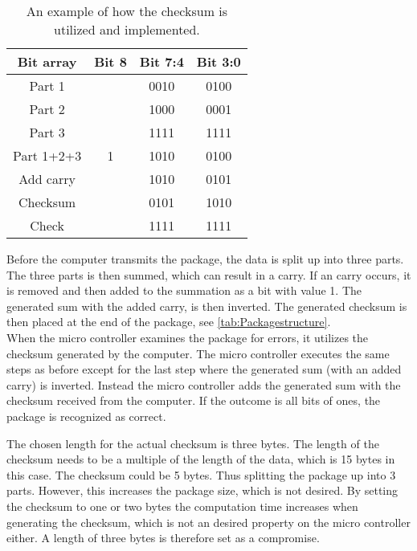 \begin{table}[H]
\centering
\begin{tabular}{|c|c|c|c|}
\hline
Bit array  & Bit 8                 & \multicolumn{1}{l|}{Bit 7:4} & Bit 3:0 \\ \hline
Part 1     &                       & 0010                         & 0100    \\ \hline
Part 2     &                       & 1000                         & 0001    \\ \hline
Part 3     &                       & 1111                         & 1111    \\ \hline
Part 1+2+3 & 1                     & 1010                         & 0100    \\ \hline
Add carry  & \multicolumn{1}{l|}{} & 1010                         & 0101    \\ \hline
Checksum   & \multicolumn{1}{l|}{} & 0101                         & 1010    \\ \hline
Check      & \multicolumn{1}{l|}{} & 1111                         & 1111    \\ \hline
\end{tabular}
\caption{An example of how the checksum is utilized and implemented.}
\label{tab:checksum}
\end{table}
Before the computer transmits the package, the data is split up into three parts. The three parts is then summed, which can result in a carry. If an carry occurs, it is removed and then added to the summation as a bit with value 1. The generated sum with the added carry, is then inverted. The generated checksum is then placed at the end of the package, see \autoref{tab:Packagestructure}.\\ 
When the micro controller examines the package for errors, it utilizes the checksum generated by the computer. The micro controller executes the same steps as before except for the last step where the generated sum (with an added carry) is inverted. Instead the micro controller adds the generated sum  with the checksum received from the computer. If the outcome is all bits of ones, the package is recognized as correct.

The chosen length for the actual checksum is three bytes. The length of the checksum needs to be a multiple of the length of the data, which is 15 bytes in this case. The checksum could be 5 bytes. Thus splitting the package up into 3 parts. However, this increases the package size, which is not desired. By setting the checksum to one or two bytes the computation time increases when generating the checksum, which is not an desired property on the micro controller either. A length of three bytes is therefore set as a compromise. 
 










